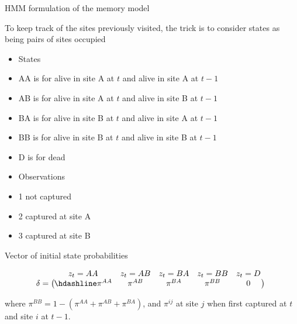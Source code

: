 \documentclass[
  12pt,
]{krantz}
\begin{document}
HMM formulation of the memory model

To keep track of the sites previously visited, the trick is to consider states as being pairs of sites occupied

\begin{itemize}
\item
  States
\item
  AA is for alive in site A at \(t\) and alive in site A at \(t-1\)
\item
  AB is for alive in site A at \(t\) and alive in site B at \(t-1\)
\item
  BA is for alive in site B at \(t\) and alive in site A at \(t-1\)
\item
  BB is for alive in site B at \(t\) and alive in site B at \(t-1\)
\item
  D is for dead
\item
  Observations
\item
  1 not captured
\item
  2 captured at site A
\item
  3 captured at site B
\end{itemize}

Vector of initial state probabilities

\[\begin{matrix}
& \\
\mathbf{\delta} =
\left ( \vphantom{ \begin{matrix} 12 \end{matrix} } \right .
\end{matrix}
\hspace{-1.2em}
\begin{matrix}
z_t=AA & z_t=AB & z_t=BA & z_t=BB &z_t=D \\ \hdashline
\pi^{AA} & \pi^{AB} & \pi^{BA} & \pi^{BB} & 0\\
\end{matrix}
\hspace{-0.2em}
\begin{matrix}
& \\
\left . \vphantom{ \begin{matrix} 12 \end{matrix} } \right )
\begin{matrix}
\end{matrix}
\end{matrix}\]

where \(\pi^{BB} = 1 - (\pi^{AA} + \pi^{AB} + \pi^{BA})\), and \(\pi^{ij}\) at site \(j\) when first captured at \(t\) and site \(i\) at \(t - 1\).
\end{document}
